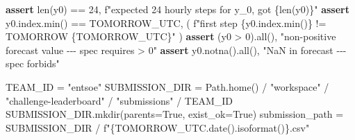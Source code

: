 \documentclass[
  english,
  letterpaper,
]{scrbook}
\newenvironment{Shaded}{\begin{snugshade}}{\end{snugshade}}
\newcommand{\BuiltInTok}[1]{\textcolor[rgb]{0.00,0.23,0.31}{#1}}
\newcommand{\ControlFlowTok}[1]{\textcolor[rgb]{0.00,0.23,0.31}{\textbf{#1}}}
\newcommand{\DecValTok}[1]{\textcolor[rgb]{0.68,0.00,0.00}{#1}}
\newcommand{\NormalTok}[1]{\textcolor[rgb]{0.00,0.23,0.31}{#1}}
\newcommand{\OperatorTok}[1]{\textcolor[rgb]{0.37,0.37,0.37}{#1}}
\newcommand{\SpecialCharTok}[1]{\textcolor[rgb]{0.37,0.37,0.37}{#1}}
\newcommand{\SpecialStringTok}[1]{\textcolor[rgb]{0.13,0.47,0.30}{#1}}
\newcommand{\StringTok}[1]{\textcolor[rgb]{0.13,0.47,0.30}{#1}}
\newcommand{\VariableTok}[1]{\textcolor[rgb]{0.07,0.07,0.07}{#1}}
\begin{document}
\begin{Shaded}
\begin{Highlighting}[]
\ControlFlowTok{assert} \BuiltInTok{len}\NormalTok{(y0) }\OperatorTok{==} \DecValTok{24}\NormalTok{,           }\SpecialStringTok{f"expected 24 hourly steps for y\_0, got }\SpecialCharTok{\{}\BuiltInTok{len}\NormalTok{(y0)}\SpecialCharTok{\}}\SpecialStringTok{"}
\ControlFlowTok{assert}\NormalTok{ y0.index.}\BuiltInTok{min}\NormalTok{() }\OperatorTok{==}\NormalTok{ TOMORROW\_UTC, (}
    \SpecialStringTok{f"first step }\SpecialCharTok{\{}\NormalTok{y0}\SpecialCharTok{.}\NormalTok{index}\SpecialCharTok{.}\BuiltInTok{min}\NormalTok{()}\SpecialCharTok{\}}\SpecialStringTok{ != TOMORROW }\SpecialCharTok{\{}\NormalTok{TOMORROW\_UTC}\SpecialCharTok{\}}\SpecialStringTok{"}
\NormalTok{)}
\ControlFlowTok{assert}\NormalTok{ (y0 }\OperatorTok{\textgreater{}} \DecValTok{0}\NormalTok{).}\BuiltInTok{all}\NormalTok{(),          }\StringTok{"non{-}positive forecast value {-}{-}{-} spec requires \textgreater{} 0"}
\ControlFlowTok{assert}\NormalTok{ y0.notna().}\BuiltInTok{all}\NormalTok{(),        }\StringTok{"NaN in forecast {-}{-}{-} spec forbids"}

\NormalTok{TEAM\_ID }\OperatorTok{=} \StringTok{"entsoe"}
\NormalTok{SUBMISSION\_DIR }\OperatorTok{=}\NormalTok{ Path.home() }\OperatorTok{/} \StringTok{"workspace"} \OperatorTok{/} \StringTok{"challenge{-}leaderboard"} \OperatorTok{/} \StringTok{"submissions"} \OperatorTok{/}\NormalTok{ TEAM\_ID}
\NormalTok{SUBMISSION\_DIR.mkdir(parents}\OperatorTok{=}\VariableTok{True}\NormalTok{, exist\_ok}\OperatorTok{=}\VariableTok{True}\NormalTok{)}
\NormalTok{submission\_path }\OperatorTok{=}\NormalTok{ SUBMISSION\_DIR }\OperatorTok{/} \SpecialStringTok{f"}\SpecialCharTok{\{}\NormalTok{TOMORROW\_UTC}\SpecialCharTok{.}\NormalTok{date()}\SpecialCharTok{.}\NormalTok{isoformat()}\SpecialCharTok{\}}\SpecialStringTok{.csv"}


\end{Highlighting}
\end{Shaded}
\end{document}
